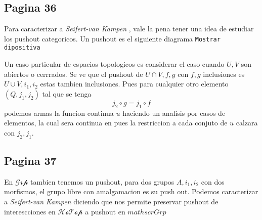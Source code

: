 \documentclass[letterpaper]{article}
\newcommand{\vank}{\emph{Seifert-van Kampen} }
\begin{document}
\subsection*{Pagina 36}
Para caracterizar a \vank , vale la pena tener una idea de estudiar los
pushout categoricos. Un pushout es el siguiente diagrama \texttt{Mostrar
  dipositiva}

Un caso particular de espacios topologicos es considerar el caso cuando
\(U,V\) son abiertos o cerrrados. Se ve que el pushout de \(U \cap V,
f, g\) con \(f,g\) inclusiones es \(U \cup V, i_1, i_2\) estas
tambien inclusiones. Pues para cualquier otro elemento \((Q, j_1, j_2)\)
tal que se tenga
\[ j_2 \circ g = j_1 \circ f\]
podemos armas la funcion continua \(u\) haciendo un analisis por casos
de elementos, la cual sera continua en pues la restriccion a cada
conjuto de \(u\) calzara con \(j_2, j_1\).

\subsection*{Pagina 37}
En \(\mathscr{Grp}\) tambien tenemos un pushout, para dos grupos
\(A,i_1,i_2\) con dos morfismos, el grupo libre con amalgamacion es su
push out. Podemos caracterizar a \vank diciendo que nos permite
preservar pushout de interescciones en \(\mathscr{HoTop}\) a pushout en \(mathscr{Grp}\)
\end{document}
